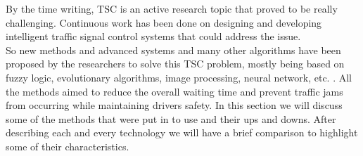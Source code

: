 \documentclass[17pt]{report}
\begin{document}
\indent 
By the time writing, TSC is an active research topic that proved to be really
challenging. Continuous work has been done on designing and developing
intelligent traffic signal control systems that could address the issue.\\
\indent \indent
So new methods and advanced systems and many other algorithms have
been proposed by the researchers to solve this TSC problem, mostly 
being based on fuzzy logic, evolutionary algorithms,
image processing, neural network, etc. \cite{Tomar2022}.
All the methods aimed to reduce the overall waiting time and prevent traffic
jams from occurring while maintaining drivers safety. In this section we will
discuss some of the methods that were put in to use and their ups and
downs. After describing each and every technology we will have a brief
comparison to highlight some of their characteristics.
\end{document}

